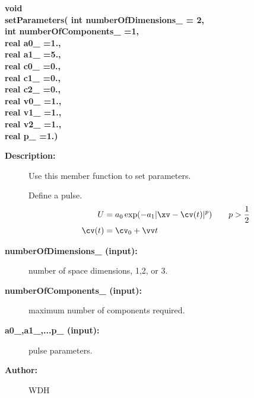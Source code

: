 \begin{flushleft} \textbf{%
void  \\ 
\settowidth{\OGPulseFunctionIncludeArgIndent}{setParameters(}%
setParameters( int numberOfDimensions\_  = 2,\\ 
\hspace{\OGPulseFunctionIncludeArgIndent}int numberOfComponents\_  =1,\\ 
\hspace{\OGPulseFunctionIncludeArgIndent}real a0\_  =1., \\ 
\hspace{\OGPulseFunctionIncludeArgIndent}real a1\_  =5.,\\ 
\hspace{\OGPulseFunctionIncludeArgIndent}real c0\_  =0.,\\ 
\hspace{\OGPulseFunctionIncludeArgIndent}real c1\_  =0.,\\ 
\hspace{\OGPulseFunctionIncludeArgIndent}real c2\_  =0.,\\ 
\hspace{\OGPulseFunctionIncludeArgIndent}real v0\_  =1.,\\ 
\hspace{\OGPulseFunctionIncludeArgIndent}real v1\_  =1.,\\ 
\hspace{\OGPulseFunctionIncludeArgIndent}real v2\_  =1.,\\ 
\hspace{\OGPulseFunctionIncludeArgIndent}real p\_   =1.)
}\end{flushleft}
\begin{description}
\item[{\bf Description:}]  Use this member function to set parameters.

    Define a pulse.
  \begin{align*}
    U &=  a_0 \exp( - a_1 | \xv-\cv(t) |^p )  \qquad p>{1\over2}\\
    \cv(t) &= \cv_0 + \vv t
  \end{align*}

\item[{\bf numberOfDimensions\_ (input):}]  number of space dimensions, 1,2, or 3.
\item[{\bf numberOfComponents\_ (input):}]  maximum number of components required.
\item[{\bf a0\_,a1\_,...p\_ (input):}]  pulse parameters. 
 
\item[{\bf Author:}]  WDH
\end{description}
